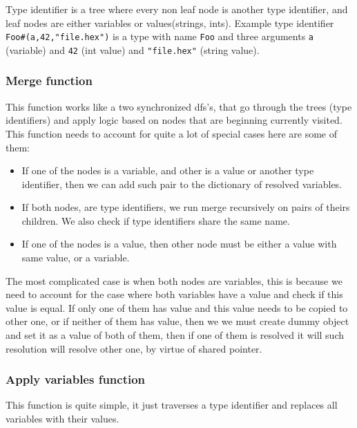 \documentclass[14pt]{report}
\begin{document}
Type identifier is a tree where every non leaf node is another type identifier, and leaf nodes are either variables or values(strings, ints). Example type identifier \verb!Foo#(a,42,"file.hex")! is a type with name \verb!Foo! and three arguments \verb!a! (variable) and \verb!42! (int value) and \verb!"file.hex"! (string value).

\subsubsection*{Merge function}
This function works like a two synchronized dfs's, that go through the trees (type identifiers) and apply logic based on nodes that are beginning currently visited.
This function needs to account for quite a lot of special cases here are some of them:
\begin{itemize}
    \item If one of the nodes is a variable, and other is a value or another type identifier, then we can add such pair to the dictionary of resolved variables.
    \item If both nodes, are type identifiers, we run merge recursively on pairs of theirs children. We also check if type identifiers share the same name.
    \item If one of the nodes is a value, then other node must be either a value with same value, or a variable.
\end{itemize}
The most complicated case is when both nodes are variables, this is because we need to account for the case where both variables have a value and check if this value is equal. If only one of them has value and this value needs to be copied to other one, or if neither of them has value, then we we must create dummy object and set it as a value of both of them, then if one of them is resolved it will such resolution will resolve other one, by virtue of shared pointer.

\subsubsection*{Apply variables function}
This function is quite simple, it just traverses a type identifier and replaces all variables with their values.
\end{document}
